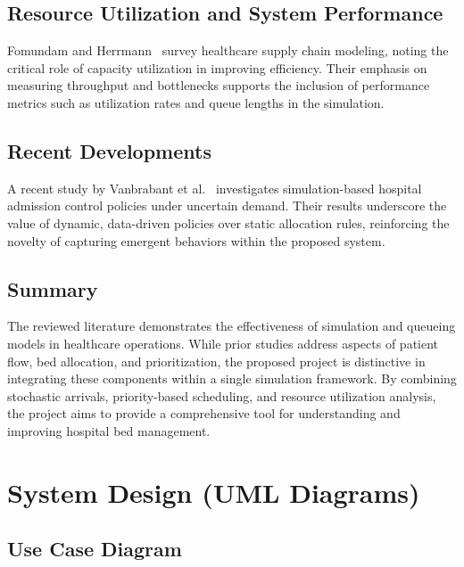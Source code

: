 \documentclass[12pt]{article}
\begin{document}
\subsection{Resource Utilization and System Performance}
Fomundam and Herrmann~\cite{fomundam2007survey} survey healthcare supply chain modeling, noting the critical role of capacity utilization in improving efficiency. Their emphasis on measuring throughput and bottlenecks supports the inclusion of performance metrics such as utilization rates and queue lengths in the simulation.

\subsection{Recent Developments}
A recent study by Vanbrabant et al.~\cite{vanbrabant2019simulation} investigates simulation-based hospital admission control policies under uncertain demand. Their results underscore the value of dynamic, data-driven policies over static allocation rules, reinforcing the novelty of capturing emergent behaviors within the proposed system.

\subsection{Summary}
The reviewed literature demonstrates the effectiveness of simulation and queueing models in healthcare operations. While prior studies address aspects of patient flow, bed allocation, and prioritization, the proposed project is distinctive in integrating these components within a single simulation framework. By combining stochastic arrivals, priority-based scheduling, and resource utilization analysis, the project aims to provide a comprehensive tool for understanding and improving hospital bed management.


\section{System Design (UML Diagrams)}
\subsection{Use Case Diagram}
\end{document}
